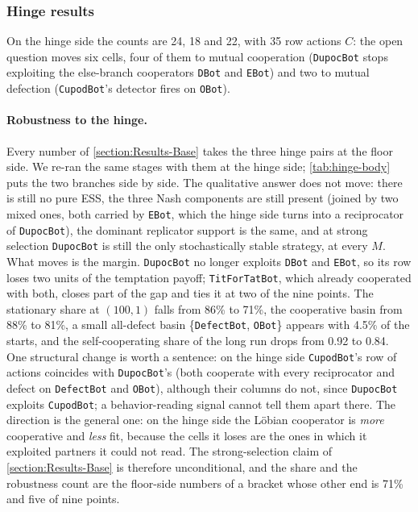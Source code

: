 \subsubsection{Hinge results}
\label{apx-subsubsection:Experiments-BaseBots-Hinge}
On the hinge side the counts are 24, 18 and 22, with 35 row actions $C$: the open question moves six cells, four of them to mutual cooperation (\texttt{DupocBot} stops exploiting the else-branch cooperators \texttt{DBot} and \texttt{EBot}) and two to mutual defection (\texttt{CupodBot}'s detector fires on \texttt{OBot}).

\paragraph{Robustness to the hinge.} Every number of \cref{section:Results-Base} takes the three hinge pairs at the floor side. We re-ran the same stages with them at the hinge side; \cref{tab:hinge-body} puts the two branches side by side. The qualitative answer does not move: there is still no pure ESS, the three Nash components are still present (joined by two mixed ones, both carried by \texttt{EBot}, which the hinge side turns into a reciprocator of \texttt{DupocBot}), the dominant replicator support is the same, and at strong selection \texttt{DupocBot} is still the only stochastically stable strategy, at every $M$. What moves is the margin. \texttt{DupocBot} no longer exploits \texttt{DBot} and \texttt{EBot}, so its row loses two units of the temptation payoff; \texttt{TitForTatBot}, which already cooperated with both, closes part of the gap and ties it at two of the nine points. The stationary share at $(100, 1)$ falls from 86\% to 71\%, the cooperative basin from 88\% to 81\%, a small all-defect basin \{\texttt{DefectBot}, \texttt{OBot}\} appears with 4.5\% of the starts, and the self-cooperating share of the long run drops from 0.92 to 0.84. One structural change is worth a sentence: on the hinge side \texttt{CupodBot}'s row of actions coincides with \texttt{DupocBot}'s (both cooperate with every reciprocator and defect on \texttt{DefectBot} and \texttt{OBot}), although their columns do not, since \texttt{DupocBot} exploits \texttt{CupodBot}; a behavior-reading signal cannot tell them apart there. The direction is the general one: on the hinge side the Löbian cooperator is \emph{more} cooperative and \emph{less} fit, because the cells it loses are the ones in which it exploited partners it could not read. The strong-selection claim of \cref{section:Results-Base} is therefore unconditional, and the share and the robustness count are the floor-side numbers of a bracket whose other end is 71\% and five of nine points.


